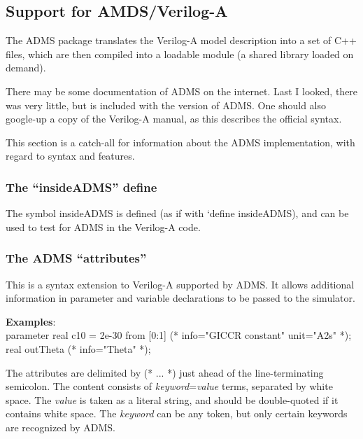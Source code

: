 \subsection{Support for AMDS/Verilog-A}


The ADMS package translates the Verilog-A model description into a set
of C++ files, which are then compiled into a loadable module (a shared
library loaded on demand).

There may be some documentation of ADMS on the internet.  Last I
looked, there was very little, but is included with the {\XicTools}
version of ADMS.  One should also google-up a copy of the Verilog-A
manual, as this describes the official syntax.

This section is a catch-all for information about the {\WRspice} ADMS
implementation, with regard to syntax and features.

\subsubsection{The ``{\vt insideADMS}'' define}

The symbol {\vt insideADMS} is defined (as if with {\vt `define
insideADMS}), and can be used to test for ADMS in the Verilog-A code.

\subsubsection{The ADMS ``attributes''}

This is a syntax extension to Verilog-A supported by ADMS.  It allows
additional information in parameter and variable declarations to be
passed to the simulator.

{\bf Examples}:\\
{\vt parameter real c10 = 2e-30 from [0:1] (* info="GICCR constant"
 unit="A2s" *);}\\
{\vt real outTheta   (* info="Theta" *);}

The attributes are delimited by {\vt (* ...  *)} just ahead of the
line-terminating semicolon.  The content consists of {\it
keyword\/}={\it value} terms, separated by white space.  The {\it
value} is taken as a literal string, and should be double-quoted if it
contains white space.  The {\it keyword} can be any token, but only
certain keywords are recognized by ADMS.

